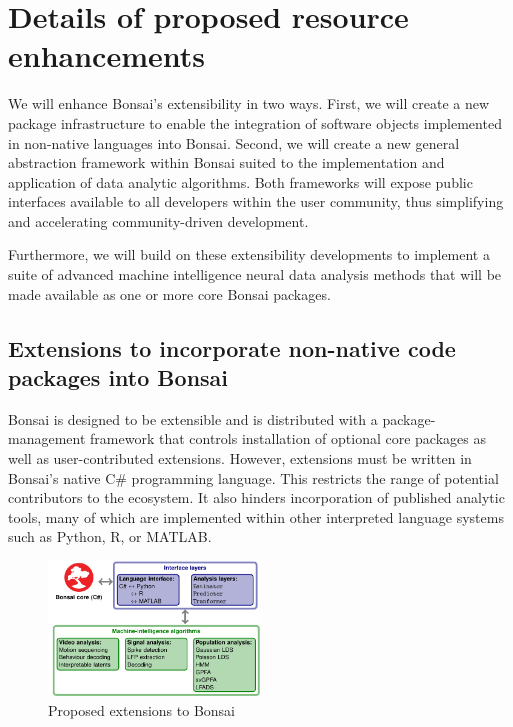 

\section{Details of proposed resource enhancements}

We will enhance Bonsai's extensibility in two ways.
%
First, we will create a new package infrastructure to enable the integration of software objects implemented in non-native languages into Bonsai.
%
Second, we will create a new general abstraction framework within Bonsai suited to the implementation and application of data analytic algorithms.
%
Both frameworks will expose public interfaces available to all developers within the user community, thus simplifying and accelerating community-driven development.

Furthermore, we will build on these extensibility developments to implement a suite of advanced machine intelligence neural data analysis methods that will be made available as one or more core Bonsai packages.

\subsection{Extensions to incorporate non-native code packages into Bonsai}

Bonsai is designed to be extensible and is distributed with a package-management framework that controls installation of optional core packages as well as user-contributed extensions.
%
However, extensions must be written in Bonsai's native C\# programming language.
%
This restricts the range of potential contributors to the ecosystem.
%
It also hinders incorporation of published analytic tools, many of which are implemented within other interpreted language systems such as Python, R, or MATLAB.  
\begin{figure}
  \includegraphics[width=0.5\textwidth]{figures/extensions.pdf}%
%   
  \caption{Proposed extensions to Bonsai}
  \label{fig:proposedBonsaiExtensions}
\end{figure}

